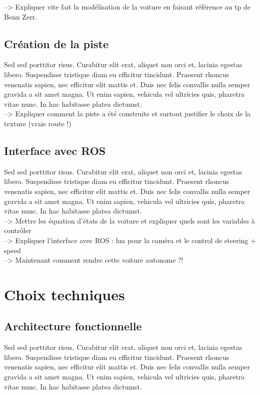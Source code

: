 \documentclass[12pt, openany]{report}
\begin{document}
--> Expliquer vite fait la modélisation de la voiture en faisant référence au tp de Benn Zerr.

\subsection{Création de la piste}
Sed sed porttitor risus. Curabitur elit erat, aliquet non orci et, lacinia egestas libero. Suspendisse tristique diam eu efficitur tincidunt. Praesent rhoncus venenatis sapien, nec efficitur elit mattis et. Duis nec felis convallis nulla semper gravida a sit amet magna. Ut enim sapien, vehicula vel ultricies quis, pharetra vitae nunc. In hac habitasse platea dictumst.\\

--> Expliquer comment la piste a été construite et surtout justifier le choix de la texture (vraie route !)

\subsection{Interface avec \textsc{ROS}}
Sed sed porttitor risus. Curabitur elit erat, aliquet non orci et, lacinia egestas libero. Suspendisse tristique diam eu efficitur tincidunt. Praesent rhoncus venenatis sapien, nec efficitur elit mattis et. Duis nec felis convallis nulla semper gravida a sit amet magna. Ut enim sapien, vehicula vel ultricies quis, pharetra vitae nunc. In hac habitasse platea dictumst.\\

--> Mettre les équation d'états de la voiture et expliquer quels sont les variables à contrôler\\

--> Expliquer l'interface avec ROS : lua pour la caméra et le control de steering + speed\\

--> Maintenant comment rendre cette voiture autonome ?!

\section{Choix techniques}
\subsection{Architecture fonctionnelle}
Sed sed porttitor risus. Curabitur elit erat, aliquet non orci et, lacinia egestas libero. Suspendisse tristique diam eu efficitur tincidunt. Praesent rhoncus venenatis sapien, nec efficitur elit mattis et. Duis nec felis convallis nulla semper gravida a sit amet magna. Ut enim sapien, vehicula vel ultricies quis, pharetra vitae nunc. In hac habitasse platea dictumst.\\
\end{document}
